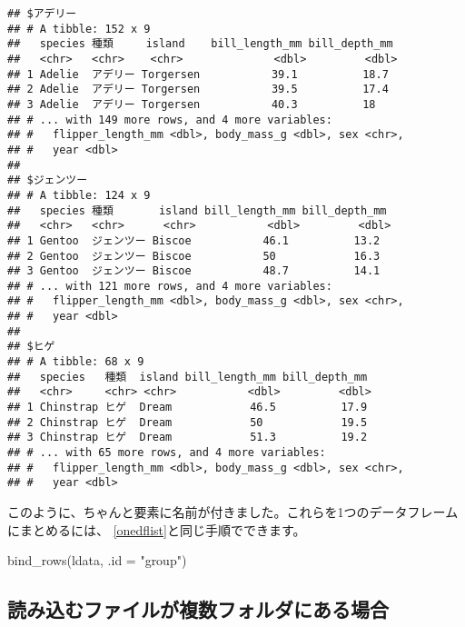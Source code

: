 \documentclass[
  xelatex,ja=standard, b5paper]{bxjsbook}
\newenvironment{Shaded}{\begin{snugshade}}{\end{snugshade}}
\newcommand{\AttributeTok}[1]{\textcolor[rgb]{0.77,0.63,0.00}{#1}}
\newcommand{\FunctionTok}[1]{\textcolor[rgb]{0.00,0.00,0.00}{#1}}
\newcommand{\NormalTok}[1]{#1}
\newcommand{\StringTok}[1]{\textcolor[rgb]{0.31,0.60,0.02}{#1}}
\begin{document}
\begin{verbatim}
## $アデリー
## # A tibble: 152 x 9
##   species 種類     island    bill_length_mm bill_depth_mm
##   <chr>   <chr>    <chr>              <dbl>         <dbl>
## 1 Adelie  アデリー Torgersen           39.1          18.7
## 2 Adelie  アデリー Torgersen           39.5          17.4
## 3 Adelie  アデリー Torgersen           40.3          18  
## # ... with 149 more rows, and 4 more variables:
## #   flipper_length_mm <dbl>, body_mass_g <dbl>, sex <chr>,
## #   year <dbl>
## 
## $ジェンツー
## # A tibble: 124 x 9
##   species 種類       island bill_length_mm bill_depth_mm
##   <chr>   <chr>      <chr>           <dbl>         <dbl>
## 1 Gentoo  ジェンツー Biscoe           46.1          13.2
## 2 Gentoo  ジェンツー Biscoe           50            16.3
## 3 Gentoo  ジェンツー Biscoe           48.7          14.1
## # ... with 121 more rows, and 4 more variables:
## #   flipper_length_mm <dbl>, body_mass_g <dbl>, sex <chr>,
## #   year <dbl>
## 
## $ヒゲ
## # A tibble: 68 x 9
##   species   種類  island bill_length_mm bill_depth_mm
##   <chr>     <chr> <chr>           <dbl>         <dbl>
## 1 Chinstrap ヒゲ  Dream            46.5          17.9
## 2 Chinstrap ヒゲ  Dream            50            19.5
## 3 Chinstrap ヒゲ  Dream            51.3          19.2
## # ... with 65 more rows, and 4 more variables:
## #   flipper_length_mm <dbl>, body_mass_g <dbl>, sex <chr>,
## #   year <dbl>
\end{verbatim}

このように、ちゃんと要素に名前が付きました。これらを1つのデータフレームにまとめるには、 \ref{onedflist}と同じ手順でできます。

\begin{Shaded}
\begin{Highlighting}[]
\FunctionTok{bind\_rows}\NormalTok{(ldata, }\AttributeTok{.id =} \StringTok{"group"}\NormalTok{)}
\end{Highlighting}
\end{Shaded}

\hypertarget{ux8aadux307fux8fbcux3080ux30d5ux30a1ux30a4ux30ebux304cux8907ux6570ux30d5ux30a9ux30ebux30c0ux306bux3042ux308bux5834ux5408}{%
\subsection{読み込むファイルが複数フォルダにある場合}\label{ux8aadux307fux8fbcux3080ux30d5ux30a1ux30a4ux30ebux304cux8907ux6570ux30d5ux30a9ux30ebux30c0ux306bux3042ux308bux5834ux5408}}
\end{document}
